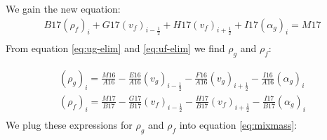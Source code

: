 \documentclass[11pt,letterpaper,titlepage]{article}
\newcommand{\half}{\frac{1}{2}}
\begin{document}
\newline
\noindent
We gain the new equation:      
\begin{equation} \label{eq:uf-elim}
\begin{aligned}
B17 (\rho_f)_i + G17  (v_f)_{i-\half} + H17  (v_f)_{i+\half} + I17(\alpha_g)_i=M17 \\
\end{aligned}
\end{equation}    
\newline
\noindent
From equation \ref{eq:ug-elim} and \ref{eq:uf-elim} we find $\rho_g$ and $\rho_f$:

\begin{equation*}
\begin{aligned}
(\rho_g)_i = \frac{M16}{A16} - \frac{E16}{A16}  (v_g)_{i-\half}  - \frac{F16}{A16}  (v_g)_{i+\half} - \frac{I16}{A16}(\alpha_g)_i\\
(\rho_f)_i = \frac{M17}{B17} - \frac{G17}{B17}  (v_f)_{i-\half}  - \frac{H17}{B17}  (v_f)_{i+\half} - \frac{I17}{B17}(\alpha_g)_i \\
\end{aligned}
\end{equation*}
\newline
\noindent
We plug these expressions for $\rho_g$ and $\rho_f$ into equation \ref{eq:mixmass}:
\end{document}
